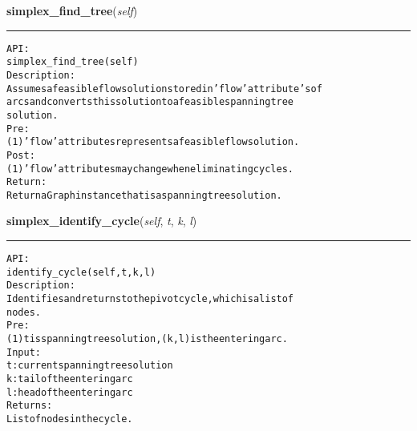     \label{coinor:gimpy:graph:Graph:simplex_find_tree}

    \vspace{0.5ex}

\hspace{.8\funcindent}\begin{boxedminipage}{\funcwidth}

    \raggedright \textbf{simplex\_find\_tree}(\textit{self})

    \vspace{-1.5ex}

    \rule{\textwidth}{0.5\fboxrule}
\setlength{\parskip}{2ex}
\begin{alltt}

API:
    simplex\_find\_tree(self)
Description:
    Assumes a feasible flow solution stored in 'flow' attribute's of
    arcs and converts this solution to a feasible spanning tree
    solution.
Pre:
    (1) 'flow' attributes represents a feasible flow solution.
Post:
    (1) 'flow' attributes may change when eliminating cycles.
Return:
    Return a Graph instance that is a spanning tree solution.
\end{alltt}

\setlength{\parskip}{1ex}
    \end{boxedminipage}

    \label{coinor:gimpy:graph:Graph:simplex_identify_cycle}

    \vspace{0.5ex}

\hspace{.8\funcindent}\begin{boxedminipage}{\funcwidth}

    \raggedright \textbf{simplex\_identify\_cycle}(\textit{self}, \textit{t}, \textit{k}, \textit{l})

    \vspace{-1.5ex}

    \rule{\textwidth}{0.5\fboxrule}
\setlength{\parskip}{2ex}
\begin{alltt}

API:
    identify\_cycle(self, t, k, l)
Description:
    Identifies and returns to the pivot cycle, which is a list of
    nodes.
Pre:
    (1) t is spanning tree solution, (k,l) is the entering arc.
Input:
    t: current spanning tree solution
    k: tail of the entering arc
    l: head of the entering arc
Returns:
    List of nodes in the cycle.
\end{alltt}

\setlength{\parskip}{1ex}
    \end{boxedminipage}

